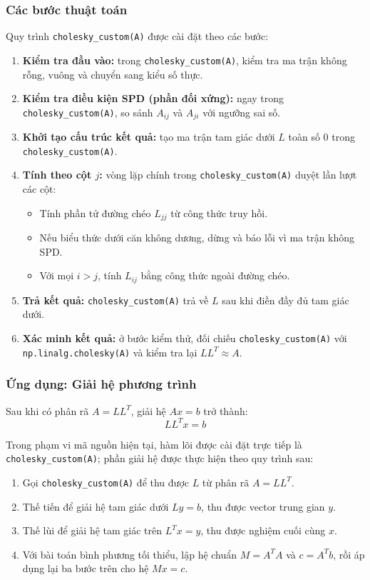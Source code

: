 \documentclass[a4paper]{article}
\begin{document}
\subsubsection{Các bước thuật toán}

Quy trình \texttt{cholesky\_custom(A)} được cài đặt theo các bước:
\begin{enumerate}
    \item \textbf{Kiểm tra đầu vào:} trong \texttt{cholesky\_custom(A)}, kiểm tra ma trận không rỗng, vuông và chuyển sang kiểu số thực.
    \item \textbf{Kiểm tra điều kiện SPD (phần đối xứng):} ngay trong \texttt{cholesky\_custom(A)}, so sánh $A_{ij}$ và $A_{ji}$ với ngưỡng sai số.
    \item \textbf{Khởi tạo cấu trúc kết quả:} tạo ma trận tam giác dưới $L$ toàn số 0 trong \texttt{cholesky\_custom(A)}.
    \item \textbf{Tính theo cột $j$:} vòng lặp chính trong \texttt{cholesky\_custom(A)} duyệt lần lượt các cột:
    \begin{itemize}
        \item Tính phần tử đường chéo $L_{jj}$ từ công thức truy hồi.
        \item Nếu biểu thức dưới căn không dương, dừng và báo lỗi vì ma trận không SPD.
        \item Với mọi $i > j$, tính $L_{ij}$ bằng công thức ngoài đường chéo.
    \end{itemize}
    \item \textbf{Trả kết quả:} \texttt{cholesky\_custom(A)} trả về $L$ sau khi điền đầy đủ tam giác dưới.
    \item \textbf{Xác minh kết quả:} ở bước kiểm thử, đối chiếu \texttt{cholesky\_custom(A)} với \texttt{np.linalg.cholesky(A)} và kiểm tra lại $LL^T \approx A$.
\end{enumerate}

\subsubsection{Ứng dụng: Giải hệ phương trình}

Sau khi có phân rã $A = LL^T$, giải hệ $Ax = b$ trở thành:
$$LL^T x = b$$

Trong phạm vi mã nguồn hiện tại, hàm lõi được cài đặt trực tiếp là \texttt{cholesky\_custom(A)}; phần giải hệ được thực hiện theo quy trình sau:
\begin{enumerate}
    \item Gọi \texttt{cholesky\_custom(A)} để thu được $L$ từ phân rã $A = LL^T$.
    \item Thế tiến để giải hệ tam giác dưới $Ly=b$, thu được vector trung gian $y$.
    \item Thế lùi để giải hệ tam giác trên $L^T x=y$, thu được nghiệm cuối cùng $x$.
    \item Với bài toán bình phương tối thiểu, lập hệ chuẩn $M=A^TA$ và $c=A^Tb$, rồi áp dụng lại ba bước trên cho hệ $Mx=c$.
\end{enumerate}
\end{document}
